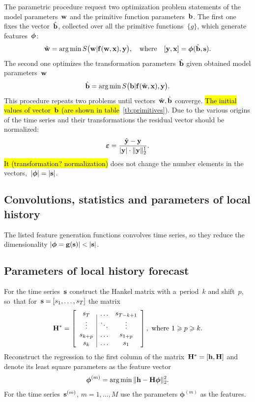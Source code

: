 \documentclass[conference]{IEEEtran}
\begin{document}
The parametric procedure request two optimization problem statements of the model parameters~$\mathbf{w}$ and the primitive function parameters~${\mathbf{b}}$. The first one fixes the vector~$\hat{{\mathbf{b}}}$, collected over all the primitive functions~$\{g\}$, which generate features~${\boldsymbol{\phi}}$:
\[
\hat{\mathbf{w}} = \arg\min S\bigl(\mathbf{w}|{\mathbf{f}}(\mathbf{w},{\mathbf{x}}),{\mathbf{y}}\bigr),\quad
\text{where}
\quad [{\mathbf{y}},{\mathbf{x}}] = {\boldsymbol{\phi}}(\hat{{\mathbf{b}}},{\mathbf{s}}).
\]
The second one optimizes the transformation parameters~$\hat{{\mathbf{b}}}$ given obtained model parameters~$\mathbf{w}$
\[
\hat{{\mathbf{b}}} = \arg\min S\bigl({\mathbf{b}}|{\mathbf{f}}(\hat{\mathbf{w}},{\mathbf{x}}),{\mathbf{y}}\bigr).
\]
This procedure repeats two problems until vectors~$\hat{\mathbf{w}},\hat{{\mathbf{b}}}$ converge. \hl{The initial values of vector~${\mathbf{b}}$ (are shown in table}~\ref{tb:primitives}). Due to the various origins of the time series and their transformations the residual vector should be normalized:
\[{\boldsymbol{\varepsilon}} = \frac{\hat{{\mathbf{y}}}-{\mathbf{y}}}{|{\mathbf{y}}| \cdot \|{\mathbf{y}}\|_2^1}.
\]
\hl{It (transformation? normalization)} does not change the number elements in the vectors,~$|{\boldsymbol{\phi}}|=|{\mathbf{s}}|$.

\subsection{Convolutions, statistics and parameters of local history}
The listed feature generation functions convolves time series, so they reduce the dimensionality $|\vf=\bg(\bs)|<|\bs|$.

\subsection{Parameters of local history forecast}
For the time series~${\mathbf{s}}$ construct the Hankel matrix with a~period~$k$ and shift~$p$, so~that for~${\mathbf{s}} = [s_1,\dots,s_T]$ the matrix
\[
\mathbf{H}^* =
\left[ \begin{array}{c|cc}
s_T  & \dots & s_{T-k+1} \\
\vdots & \ddots & \vdots \\
s_{k+p} & \dots & s_{1+p}\\
s_k & \dots & s_1 \\
\end{array}
\right],
\text{~where~} 1\geqslant p \geqslant k .
\]
Reconstruct the regression to the first column of the matrix~$\mathbf{H}^*=[{\mathbf{h}}, \mathbf{H}]$ and denote its least square parameters as the feature vector
\[
\boldsymbol{\phi}^{(m)} = \arg\min \| {\mathbf{h}}-\mathbf{H} \boldsymbol{\phi}\|_2^2.
\]
For the time series~${\mathbf{s}}^{(m)}$, $m=1,\dots, M$ use the parameters $\boldsymbol{\phi}^{(m)}$ as the features.
\end{document}
